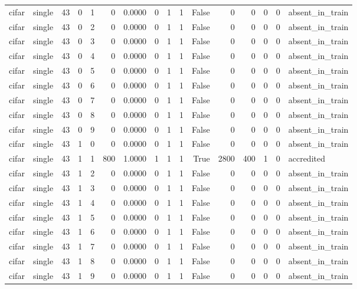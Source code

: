 \begin{tabular}{llrrrrrrrrrrrrrl}
cifar & single & 43 & 0 & 1 & 0 & 0.0000 & 0 & 1 & 1 & False & 0 & 0 & 0 & 0 & absent\_in\_train \\
cifar & single & 43 & 0 & 2 & 0 & 0.0000 & 0 & 1 & 1 & False & 0 & 0 & 0 & 0 & absent\_in\_train \\
cifar & single & 43 & 0 & 3 & 0 & 0.0000 & 0 & 1 & 1 & False & 0 & 0 & 0 & 0 & absent\_in\_train \\
cifar & single & 43 & 0 & 4 & 0 & 0.0000 & 0 & 1 & 1 & False & 0 & 0 & 0 & 0 & absent\_in\_train \\
cifar & single & 43 & 0 & 5 & 0 & 0.0000 & 0 & 1 & 1 & False & 0 & 0 & 0 & 0 & absent\_in\_train \\
cifar & single & 43 & 0 & 6 & 0 & 0.0000 & 0 & 1 & 1 & False & 0 & 0 & 0 & 0 & absent\_in\_train \\
cifar & single & 43 & 0 & 7 & 0 & 0.0000 & 0 & 1 & 1 & False & 0 & 0 & 0 & 0 & absent\_in\_train \\
cifar & single & 43 & 0 & 8 & 0 & 0.0000 & 0 & 1 & 1 & False & 0 & 0 & 0 & 0 & absent\_in\_train \\
cifar & single & 43 & 0 & 9 & 0 & 0.0000 & 0 & 1 & 1 & False & 0 & 0 & 0 & 0 & absent\_in\_train \\
cifar & single & 43 & 1 & 0 & 0 & 0.0000 & 0 & 1 & 1 & False & 0 & 0 & 0 & 0 & absent\_in\_train \\
cifar & single & 43 & 1 & 1 & 800 & 1.0000 & 1 & 1 & 1 & True & 2800 & 400 & 1 & 0 & accredited \\
cifar & single & 43 & 1 & 2 & 0 & 0.0000 & 0 & 1 & 1 & False & 0 & 0 & 0 & 0 & absent\_in\_train \\
cifar & single & 43 & 1 & 3 & 0 & 0.0000 & 0 & 1 & 1 & False & 0 & 0 & 0 & 0 & absent\_in\_train \\
cifar & single & 43 & 1 & 4 & 0 & 0.0000 & 0 & 1 & 1 & False & 0 & 0 & 0 & 0 & absent\_in\_train \\
cifar & single & 43 & 1 & 5 & 0 & 0.0000 & 0 & 1 & 1 & False & 0 & 0 & 0 & 0 & absent\_in\_train \\
cifar & single & 43 & 1 & 6 & 0 & 0.0000 & 0 & 1 & 1 & False & 0 & 0 & 0 & 0 & absent\_in\_train \\
cifar & single & 43 & 1 & 7 & 0 & 0.0000 & 0 & 1 & 1 & False & 0 & 0 & 0 & 0 & absent\_in\_train \\
cifar & single & 43 & 1 & 8 & 0 & 0.0000 & 0 & 1 & 1 & False & 0 & 0 & 0 & 0 & absent\_in\_train \\
cifar & single & 43 & 1 & 9 & 0 & 0.0000 & 0 & 1 & 1 & False & 0 & 0 & 0 & 0 & absent\_in\_train \\

\end{tabular}
